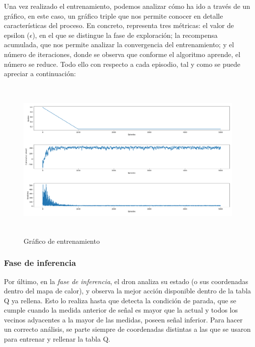 Una vez realizado el entrenamiento, podemos analizar cómo ha ido a través de un gráfico, en este caso, un gráfico triple que nos permite conocer en detalle características del proceso. En concreto, representa tres métricas: el valor de epsilon ($\epsilon$), en el que se distingue la fase de exploración; la recompensa acumulada, que nos permite analizar la convergencia del entrenamiento; y el número de iteraciones, donde se observa que conforme el algoritmo aprende, el número se reduce. Todo ello con respecto a cada episodio, tal y como se puede apreciar a continuación:\\

\begin{figure} [H]
    \begin{center}
    \includegraphics[height=8cm]{imagenes/cap4/14_training_graph.png}
    \end{center}
    \caption[Gráfico de entrenamiento]{Gráfico de entrenamiento}
    \label{fig:training_graph}
\end{figure}

\subsubsection{Fase de inferencia}
\label{subsubsec:test}

Por último, en la \emph{fase de inferencia}, el dron analiza su estado (o sus coordenadas dentro del mapa de calor), y observa la mejor acción disponible dentro de la tabla Q ya rellena. Esto lo realiza hasta que detecta la condición de parada, que se cumple cuando la medida anterior de señal es mayor que la actual y todos los vecinos adyacentes a la mayor de las medidas, poseen señal inferior. Para hacer un correcto análisis, se parte siempre de coordenadas distintas a las que se usaron para entrenar y rellenar la tabla Q.

